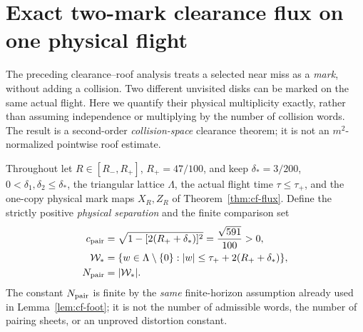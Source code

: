\section{Exact two-mark clearance flux on one physical flight}
\label{sec:dc-two-mark}
The preceding clearance--roof analysis treats a selected near miss as a
\emph{mark}, without adding a collision.  Two different unvisited disks
can be marked on the same actual flight.  Here we quantify their
physical multiplicity exactly, rather than assuming independence or
multiplying by the number of collision words.  The result is a
second-order \emph{collision-space} clearance theorem; it is not an
$m^2$-normalized pointwise roof estimate.

Throughout let $R\in[R_-,R_+]$, $R_+=47/100$, and keep
$\delta_*=3/200$, $0<\delta_1,\delta_2\le\delta_*$, the triangular
lattice $\Lambda$, the actual flight time $\tau\le\tau_+$, and the
one-copy physical mark maps $X_R,Z_R$ of
Theorem~\ref{thm:cf-flux}.  Define the strictly positive \emph{physical
separation} and the finite comparison set
\begin{align}
 c_{\rm pair}
   &=\sqrt{1-[2(R_++\delta_*)]^2}
      =\frac{\sqrt{591}}{100}>0,\label{eq:dc-constants}\\
 \mathcal W_*
   &=\{w\in\Lambda\setminus\{0\}:|w|\le\tau_++2(R_++\delta_*)\},
   \notag\\
 N_{\rm pair}&=|\mathcal W_*|.\notag
\end{align}
The constant $N_{\rm pair}$ is finite by the \emph{same} finite-horizon
assumption already used in Lemma~\ref{lem:cf-foot}; it is not the
number of admissible words, the number of pairing sheets, or an
unproved distortion constant.

